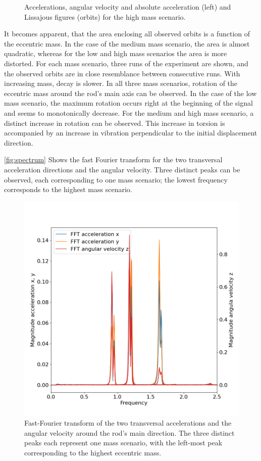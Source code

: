 \documentclass{article}
\begin{document}
\begin{figure}
\begin{subfigure}[b]{0.45\textwidth}
        \caption{}
        \label{fig:high-mass:orbit}
    \end{subfigure}
    
    
    \caption{Accelerations, angular velocity and absolute acceleration (left) and Lissajous figures (orbits) for the high mass scenario.}
    \label{fig:high-mass}
\end{figure}

It becomes apparent, that the area enclosing all observed orbits is a function of the eccentric mass. In the case of the medium mass scenario, the area is almost quadratic, whereas for the low and high mass scenarios the area is more distorted. For each mass scenario, three runs of the experiment are shown, and the observed orbits are in close resemblance between consecutive runs. With increasing mass, decay is slower. In all three mass scenarios, rotation of the eccentric mass around the rod's main axis can be observed. In the case of the low mass scenario, the maximum rotation occurs right at the beginning of the signal and seems to monotonically decrease. For the medium and high mass scenario, a distinct increase in rotation can be observed. This increase in torsion is accompanied by an increase in vibration perpendicular to the initial displacement direction.

\clearpage

\autoref{fig:spectrum} Shows the fast Fourier transform for the two transversal acceleration directions and the angular velocity. Three distinct peaks can be observed, each corresponding to one mass scenario; the lowest frequency corresponds to the highest mass scenario. 

\begin{figure}[ht]
    \centering
    \includegraphics[width=0.5\linewidth]{results/experiment/spectrum.png}
    \caption{Fast-Fourier transform of the two transversal accelerations and the angular velocity around the rod's main direction. The three distinct peaks each represent one mass scenario, with the left-most peak corresponding to the highest eccentric mass.}
    \label{fig:spectrum}
\end{figure}
\end{document}

